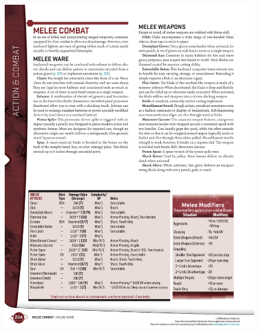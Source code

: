 \begin{figure}[htbp!]%
   \centering
   \includegraphics[scale=0.95]{gfx/combat-melee-modifiers}%
\end{figure}%

